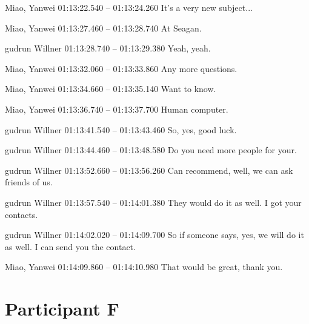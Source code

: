 {Miao, Yanwei 01:13:22.540 -- 01:13:24.260
It's a very new subject...

Miao, Yanwei 01:13:27.460 -- 01:13:28.740
At Seagan.

gudrun Willner 01:13:28.740 -- 01:13:29.380
Yeah, yeah.

Miao, Yanwei 01:13:32.060 -- 01:13:33.860
Any more questions.

Miao, Yanwei 01:13:34.660 -- 01:13:35.140
Want to know.

Miao, Yanwei 01:13:36.740 -- 01:13:37.700
Human computer.

gudrun Willner 01:13:41.540 -- 01:13:43.460
So, yes, good luck.

gudrun Willner 01:13:44.460 -- 01:13:48.580
Do you need more people for your.

gudrun Willner 01:13:52.660 -- 01:13:56.260
Can recommend, well, we can ask friends of us.

gudrun Willner 01:13:57.540 -- 01:14:01.380
They would do it as well. I got your contacts.

gudrun Willner 01:14:02.020 -- 01:14:09.700
So if someone says, yes, we will do it as well. I can send you the contact.

Miao, Yanwei 01:14:09.860 -- 01:14:10.980
That would be great, thank you.
}


\section*{Participant F}


